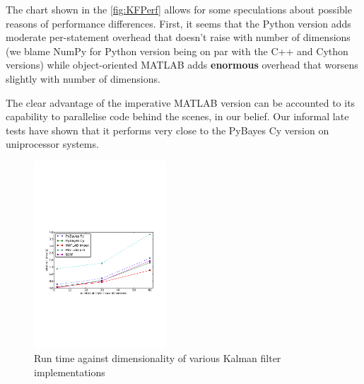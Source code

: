 The chart shown in the \autoref{fig:KFPerf} allows for some speculations about possible reasons
of performance differences. First, it seems that the Python version adds moderate per-statement
overhead that doesn't raise with number of dimensions (we blame NumPy for Python version being
on par with the C++ and Cython versions) while object-oriented MATLAB adds \textbf{enormous} overhead
that worsens slightly with number of dimensions.

The clear advantage of the imperative MATLAB version can be accounted to its capability to parallelise
code behind the scenes, in our belief. Our informal late tests have shown that it performs very
close to the PyBayes Cy version on uniprocessor systems.

\begin{figure}[h!]
	\centering
	\includegraphics[height=7cm,keepaspectratio=true,clip=true,trim=19mm 85mm 20mm 111mm]{./KFPerf.pdf}
	\caption{Run time against dimensionality of various Kalman filter implementations}
	\label{fig:KFPerf}
\end{figure}
